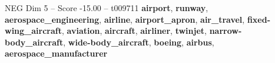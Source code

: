 \begin{textsample}{NEG Dim 5 – Score -15.00 – t009711}  \label{ex:f5_neg_021}
\textbf{airport}, \textbf{runway}, \textbf{aerospace\_engineering}, \textbf{airline}, \textbf{airport\_apron}, \textbf{air\_travel}, \textbf{fixed-wing\_aircraft}, \textbf{aviation}, \textbf{aircraft}, \textbf{airliner}, \textbf{twinjet}, \textbf{narrow-body\_aircraft}, \textbf{wide-body\_aircraft}, \textbf{boeing}, \textbf{airbus}, \textbf{aerospace\_manufacturer}

\end{textsample}
